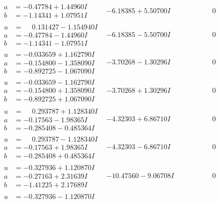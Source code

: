 \documentclass[1p]{elsarticle_modified}
\theoremstyle{definition}
\begin{document}
$$\begin{array}{c|c|c}
\begin{aligned}
a &= -0.47784 + 1.44960 I \\
b &= -1.14341 + 1.07951 I\end{aligned}
 & -6.18385 + 5.50700 I & \phantom{-0.000000 } 0 \\ \hline\begin{aligned}
u &= \phantom{-}0.131427 - 1.154940 I \\
a &= -0.47784 - 1.44960 I \\
b &= -1.14341 - 1.07951 I\end{aligned}
 & -6.18385 - 5.50700 I & \phantom{-0.000000 } 0 \\ \hline\begin{aligned}
u &= -0.033659 + 1.162790 I \\
a &= -0.154800 - 1.358090 I \\
b &= -0.892725 - 1.067090 I\end{aligned}
 & -3.70268 - 1.30296 I & \phantom{-0.000000 } 0 \\ \hline\begin{aligned}
u &= -0.033659 - 1.162790 I \\
a &= -0.154800 + 1.358090 I \\
b &= -0.892725 + 1.067090 I\end{aligned}
 & -3.70268 + 1.30296 I & \phantom{-0.000000 } 0 \\ \hline\begin{aligned}
u &= \phantom{-}0.293787 + 1.128340 I \\
a &= -0.17563 - 1.98365 I \\
b &= -0.285408 - 0.485364 I\end{aligned}
 & -4.32303 + 6.86710 I & \phantom{-0.000000 } 0 \\ \hline\begin{aligned}
u &= \phantom{-}0.293787 - 1.128340 I \\
a &= -0.17563 + 1.98365 I \\
b &= -0.285408 + 0.485364 I\end{aligned}
 & -4.32303 - 6.86710 I & \phantom{-0.000000 } 0 \\ \hline\begin{aligned}
u &= -0.327936 + 1.120870 I \\
a &= -0.27163 + 2.31639 I \\
b &= -1.41225 + 2.17689 I\end{aligned}
 & -10.47560 - 9.06708 I & \phantom{-0.000000 } 0 \\ \hline\begin{aligned}
u &= -0.327936 - 1.120870 I \\

\end{aligned}
\end{array}$$
\end{document}

